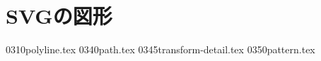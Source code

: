 \chapter{SVGの図形}
 \CH 0310polyline.tex
 \CH 0340path.tex
 \CH 0345transform-detail.tex
 \CH 0350pattern.tex
\iffalse
 \CH 0360image.tex
 \CH 0370mask.tex
\fi